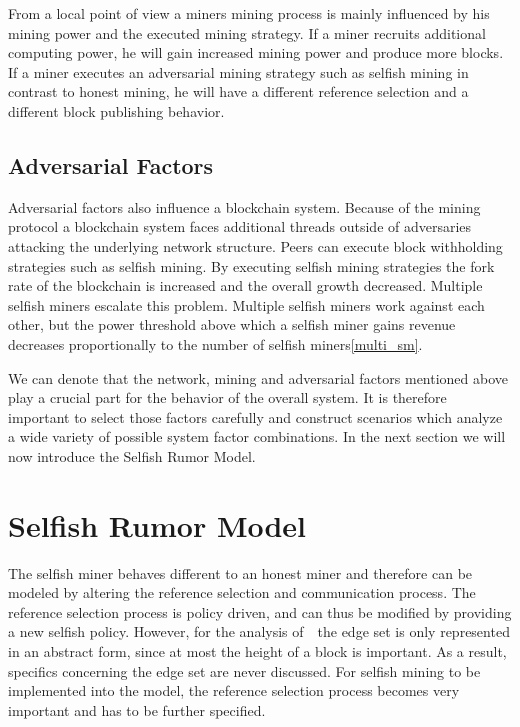 From a local point of view a miners mining process is mainly influenced by his mining power and the executed mining strategy. If a miner recruits additional computing power, he will gain increased mining power and produce more blocks. If a miner executes an adversarial mining strategy such as selfish mining in contrast to honest mining, he will have a different reference selection and a different block publishing behavior.

\subsection{Adversarial Factors}
Adversarial factors also influence a blockchain system. Because of the mining protocol a blockchain system faces additional threads outside of adversaries attacking the underlying network structure. Peers can execute block withholding strategies such as selfish mining. By executing selfish mining strategies the fork rate of the blockchain is increased and the overall growth decreased. Multiple selfish miners escalate this problem. Multiple selfish miners work against each other, but the power threshold above which a selfish miner gains revenue decreases proportionally to the number of selfish miners\ref{multi_sm}.


We can denote that the network, mining and adversarial factors mentioned above play a crucial part for the behavior of the overall system. It is therefore important to select those factors carefully and construct scenarios which analyze a wide variety of possible system factor combinations. In the next section we will now introduce the Selfish Rumor Model.

\section{Selfish Rumor Model}\label{selfishmodel}
The selfish miner behaves different to an honest miner and therefore can be modeled by altering the reference selection and communication process. The reference selection process is policy driven, and can thus be modified by providing a new selfish policy. However, for the analysis of~~the edge set is only represented in an abstract form, since at most the height of a block is important. As a result, specifics concerning the edge set are never discussed. For selfish mining to be implemented into the model, the reference selection process becomes very important and has to be further specified.
